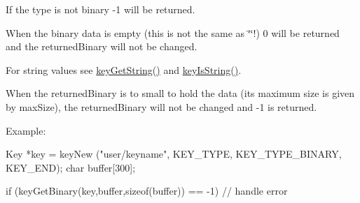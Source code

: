 If the type is not binary -\/1 will be returned.

When the binary data is empty (this is not the same as \char`\"{}\char`\"{}!) 0 will be returned and the returnedBinary will not be changed.

For string values see \hyperlink{group__keyvalue_ga41b9fac5ccddafe407fc0ae1e2eb8778}{keyGetString()} and \hyperlink{group__keytest_gaea7670778abd07fee0fe8ac12a149190}{keyIsString()}.

When the returnedBinary is to small to hold the data (its maximum size is given by maxSize), the returnedBinary will not be changed and -\/1 is returned.

\begin{DoxyParagraph}{Example:}

\begin{DoxyCode}
Key *key = keyNew ("user/keyname", KEY_TYPE, KEY_TYPE_BINARY, KEY_END);
char buffer[300];

if (keyGetBinary(key,buffer,sizeof(buffer)) == -1)
{
        // handle error
}
\end{DoxyCode}

\end{DoxyParagraph}

